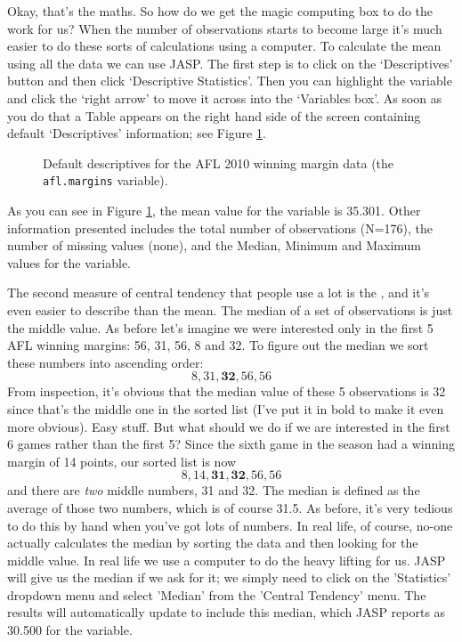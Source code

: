 
Okay, that's the maths. So how do we get the magic computing box to do the work for us? When the number of observations starts to become large it's much easier to do these sorts of calculations using a computer. To calculate the mean using all the data we can use JASP. The first step is to click on the `Descriptives' button and then click `Descriptive Statistics'. Then you can highlight the  variable and click the `right arrow' to move it across into the `Variables box'. As soon as you do that a Table appears on the right hand side of the screen containing default `Descriptives' information; see Figure \ref{fig:descriptives_default}. 

\vspace{0.5cm}
\begin{figure}[ht]
\begin{center}
\caption{Default descriptives for the AFL 2010 winning margin data (the \texttt{afl.margins} variable). }
\label{fig:descriptives_default}
\HR
\end{center}
\end{figure}

As you can see in Figure \ref{fig:descriptives_default}, the mean value for the  variable is 35.301. Other information presented includes the total number of observations (N=176), the number of missing values (none), and the Median, Minimum and Maximum values for the variable. 


The second measure of central tendency that people use a lot is the , and it's even easier to describe than the mean. The median of a set of observations is just the middle value. As before let's imagine we were interested only in the first 5 AFL winning margins: 56, 31, 56, 8 and 32. To figure out the median we sort these numbers into ascending order:
$$
8, 31, \mathbf{32}, 56, 56
$$
From inspection, it's obvious that the median value of these 5 observations is 32 since that's the middle one in the sorted list (I've put it in bold to make it even more obvious). Easy stuff. But what should we do if we are interested in the first 6 games rather than the first 5? Since the sixth game in the season had a winning margin of 14 points, our sorted list is now 
$$
8, 14, \mathbf{31}, \mathbf{32}, 56, 56
$$
and there are {\it two} middle numbers, 31 and 32. The median is defined as the average of those two numbers, which is of course 31.5. As before, it's very tedious to do this by hand when you've got lots of numbers. In real life, of course, no-one actually calculates the median by sorting the data and then looking for the middle value. In real life we use a computer to do the heavy lifting for us. JASP will give us the median if we ask for it; we simply need to click on the 'Statistics' dropdown menu and select 'Median' from the 'Central Tendency' menu. The results will automatically update to include this median, which JASP reports as 30.500 for the  variable.

